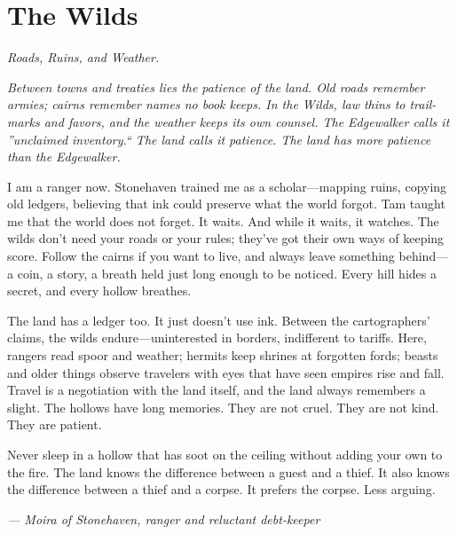 \newpage

\newpage

\chapter{The Wilds}
\emph{Roads, Ruins, and Weather.}

\noindent
{\Large
\textit{Between towns and treaties lies the patience of the land. Old roads remember armies; cairns remember names no book keeps. In the Wilds, law thins to trail-marks and favors, and the weather keeps its own counsel. The Edgewalker calls it ''unclaimed inventory.`` The land calls it patience. The land has more patience than the Edgewalker.}

\vspace{0.5em}

I am a ranger now. Stonehaven trained me as a scholar---mapping ruins, copying old ledgers, believing that ink could preserve what the world forgot. Tam taught me that the world does not forget. It waits. And while it waits, it watches. The wilds don't need your roads or your rules; they've got their own ways of keeping score. Follow the cairns if you want to live, and always leave something behind---a coin, a story, a breath held just long enough to be noticed. Every hill hides a secret, and every hollow breathes.

\vspace{0.5em}

The land has a ledger too. It just doesn't use ink. Between the cartographers' claims, the wilds endure---uninterested in borders, indifferent to tariffs. Here, rangers read spoor and weather; hermits keep shrines at forgotten fords; beasts and older things observe travelers with eyes that have seen empires rise and fall. Travel is a negotiation with the land itself, and the land always remembers a slight. The hollows have long memories. They are not cruel. They are not kind. They are patient.

\vspace{0.5em}

Never sleep in a hollow that has soot on the ceiling without adding your own to the fire. The land knows the difference between a guest and a thief. It also knows the difference between a thief and a corpse. It prefers the corpse. Less arguing.

\vspace{1em}

\noindent\textit{--- Moira of Stonehaven, ranger and reluctant debt-keeper}
}

